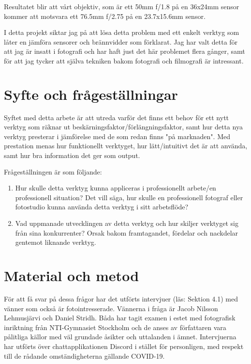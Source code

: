 \documentclass[11pt]{article}
\begin{document}
Resultatet blir att vårt objektiv, som är ett 50mm f/1.8 på en 36x24mm sensor
kommer att motsvara ett 76.5mm f/2.75 på en 23.7x15.6mm sensor.

\bigskip
I detta projekt siktar jag på att lösa detta problem med ett enkelt verktyg som
låter en jämföra sensorer och brännvidder som förklarat. Jag har valt detta för
att jag är insatt i fotografi och har haft just det här problemet flera gånger,
samt för att jag tycker att själva tekniken bakom fotografi och filmografi är
intressant.\par

\section{Syfte och frågeställningar}
Syftet med detta arbete är att utreda varför det finns ett behov
för ett nytt verktyg som räknar ut beskärningsfaktor/förlängningsfaktor, samt
hur detta nya verktyg presterar i jämförelse med de som redan finns "på
marknaden". Med prestation menas hur funktionellt verktyget, hur lätt/intuitivt
det är att använda, samt hur bra information det ger som output.

Frågeställningen är som följande:\par

\begin{enumerate}
    \item Hur skulle detta verktyg kunna appliceras i professionellt arbete/en
        professionell situation? Det vill säga, hur skulle en professionell
        fotograf eller fotostudio kunna använda detta verktyg i sitt
        arbetsflöde?
    \item Vad uppmanade utvecklingen av detta verktyg och hur skiljer verktyget
        sig från sina konkurrenter? Orsak bakom framtagandet, fördelar och
        nackdelar gentemot liknande verktyg.
\end{enumerate}

\section{Material och metod}
\sloppy
För att få svar på dessa frågor har det utförts intervjuer (läs: Sektion 4.1)
med vänner som också är fotointresserade. Vännerna i fråga är Jacob Nilsson
Lehmusjärvi och Daniel Stridh. Båda har tagit examen i estet med fotografisk
inriktning från NTI-Gymnasiet Stockholm och de anses av författaren vara
pålitliga källor med väl grundade åsikter och uttalanden i ämnet. Intervjuerna
har utförts över chattapplikationen Discord i stället för personligen, med 
respekt till de rådande omständigheterna gällande COVID-19.\par
\end{document}

